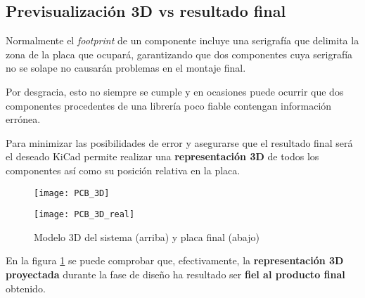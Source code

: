 \subsection{Previsualización 3D vs resultado final\label{sec:Modelo_3D}}

Normalmente el \textit{footprint} de un componente incluye una serigrafía que delimita la zona de la placa que ocupará, garantizando que dos componentes cuya serigrafía no se solape no causarán problemas en el montaje final.

Por desgracia, esto no siempre se cumple y en ocasiones puede ocurrir que dos componentes procedentes de una librería poco fiable contengan información errónea. 

\clearpage

Para minimizar las posibilidades de error y asegurarse que el resultado final será el deseado KiCad permite realizar una \textbf{representación 3D} de todos los componentes así como su posición relativa en la placa.


\begin{figure} [h]
    \centering
    \texttt{[image: PCB\_3D]}

    \texttt{[image: PCB\_3D\_real]}
    \caption{Modelo 3D del sistema (arriba) y placa final (abajo)}
    \label{fig:Comparativa_PCB_final}
\end{figure}

En la figura \ref{fig:Comparativa_PCB_final} se puede comprobar que, efectivamente, la \textbf{representación 3D proyectada}  durante la fase de diseño ha resultado ser \textbf{fiel al producto final} obtenido.
